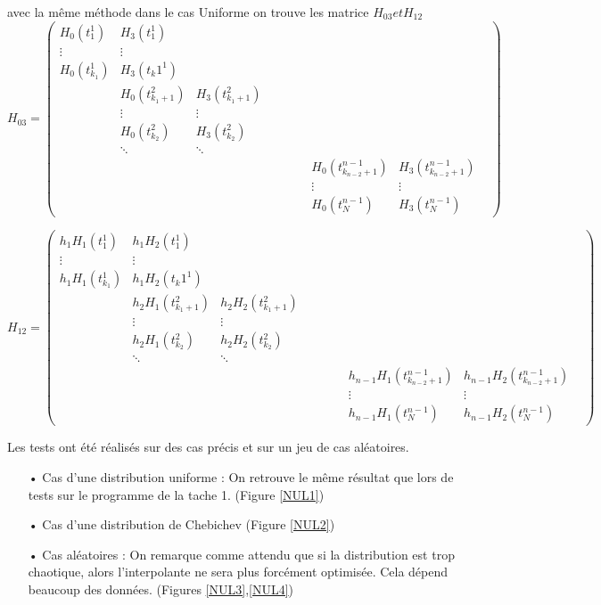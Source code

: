 \documentclass[a4paper,12pt]{article} %
\begin{document}
                avec la même méthode dans le cas Uniforme on trouve les matrice $H_{03} et H_{12}$
                $$H_{03}=\begin{pmatrix} H_0(t_1^1)&H_3(t_1^1)& & & & & & & &  \\ \vdots&\vdots& & & & & & &  \\ H_0(t_{k_1}^1)&H_3(t_k1^1)& & & & & & & \\ &H_0(t_{{k_1}+1}^2)&H_3(t_{{k_1}+1}^2)& & & & & &   \\ &\vdots&\vdots& & & & & &  \\ &H_0(t_{k_2}^2)&H_3(t_{k_2}^2)& & & & & & \\ &\ddots&\ddots & & & & & & & \\ & & & & & & &H_0(t_{{k_{n-2}}+1}^{n-1}) &H_3(t_{{k_{n-2}}+1}^{n-1})\\ & & & & & & &\vdots &\vdots\\ & & & & & & &H_0(t_N^{n-1}) &H_3(t_N^{n-1}) \end{pmatrix}$$
                
                
                $$H_{12}=\begin{pmatrix} h_1H_1(t_1^1)&h_1H_2(t_1^1)& & & & & & & &  \\ \vdots&\vdots& & & & & & &  \\ h_1H_1(t_{k_1}^1)&h_1H_2(t_k1^1)& & & & & & & \\ &h_2H_1(t_{{k_1}+1}^2)&h_2H_2(t_{{k_1}+1}^2)& & & & & &   \\ &\vdots&\vdots& & & & & &  \\ &h_2H_1(t_{k_2}^2)&h_2H_2(t_{k_2}^2)& & & & & & \\ &\ddots&\ddots & & & & & & & \\ & & & & & & &h_{n-1}H_1(t_{{k_{n-2}}+1}^{n-1}) &h_{n-1}H_2(t_{{k_{n-2}}+1}^{n-1})\\ & & & & & & &\vdots &\vdots\\ & & & & & & &h_{n-1}H_1(t_N^{n-1}) &h_{n-1}H_2(t_N^{n-1}) \end{pmatrix}$$
                


    			Les tests ont été réalisés sur des cas précis et sur un jeu de cas aléatoires.
    
                \begin{itemize}
                \item[•] Cas d'une distribution uniforme : On retrouve le même résultat que lors de tests sur le programme de la tache 1. (Figure \ref{NUL1})
                \item[•] Cas d'une distribution de Chebichev (Figure \ref{NUL2})
                \item[•] Cas aléatoires : On remarque comme attendu que si la distribution est trop chaotique, alors l'interpolante ne sera plus forcément optimisée. Cela dépend beaucoup des données. (Figures \ref{NUL3},\ref{NUL4})
                \end{itemize}
                
\end{document}
